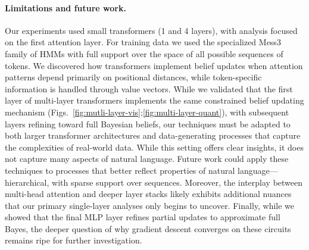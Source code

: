 \documentclass{article}
\theoremstyle{plain}
\theoremstyle{definition}
\theoremstyle{remark}
\begin{document}
\paragraph{Limitations and future work.}

Our experiments used small transformers (1 and 4 layers), with analysis focused on the first attention layer. For training data we used the specialized Mess3 family of HMMs with full support over the space of all possible sequences of tokens. 
We discovered how transformers implement belief updates when attention patterns depend primarily on positional distances, while token-specific information is handled through value vectors.
While we validated that the first layer of multi-layer transformers implements the same constrained belief updating mechanism (Figs.~\ref{fig:mutli-layer-vis};\ref{fig:multi-layer-quant}), with subsequent layers refining toward full Bayesian beliefs, our techniques must be adapted to both larger transformer architectures and data-generating processes that capture the complexities of real-world data.
While this setting offers clear insights, it does not capture many aspects of natural language.
Future work could apply these techniques to processes that better reflect properties of natural language---hierarchical, with sparse support over sequences.
Moreover, the interplay between multi-head attention and deeper layer stacks likely exhibits additional nuances that our primary single-layer analyses only begins to uncover.
Finally, while we showed that the final 
MLP layer refines partial updates to approximate full Bayes, the deeper 
question of why gradient descent converges on these circuits remains ripe for further investigation.
\end{document}
